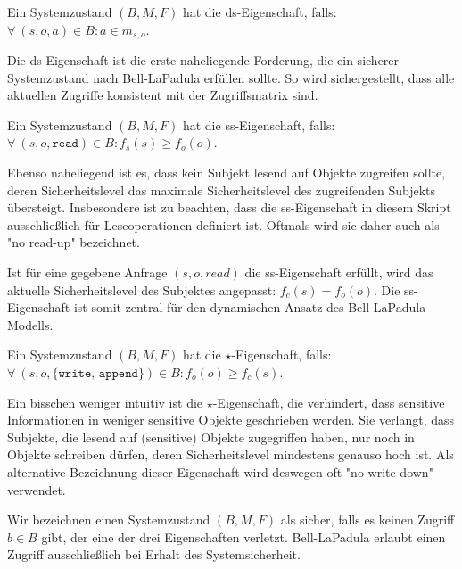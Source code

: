 \bigskip
\begin{definition}
	Ein Systemzustand \((B, M, F)\) hat die ds-Eigenschaft, falls: \(\forall\ (s, o, a) \in B : a \in m_{s,o}\).
\end{definition}
\bigskip

Die ds-Eigenschaft ist die erste naheliegende Forderung, die ein sicherer Systemzustand nach Bell-LaPadula erfüllen sollte. So wird sichergestellt, dass alle aktuellen Zugriffe konsistent mit der Zugriffsmatrix sind. 

\bigskip
\begin{definition}
	Ein Systemzustand \((B, M, F)\) hat die ss-Eigenschaft, falls: \(\forall\ (s, o, \texttt{read}) \in B : f_s(s) \geq f_o(o)\).
\end{definition}
\bigskip

Ebenso naheliegend ist es, dass kein Subjekt lesend auf Objekte zugreifen sollte, deren Sicherheitslevel das maximale
Sicherheitslevel des zugreifenden Subjekts übersteigt. Insbesondere ist zu beachten, dass die ss-Eigenschaft in diesem
Skript ausschließlich für Leseoperationen definiert ist. Oftmals wird sie daher auch als "{}no read-up"{} bezeichnet.

Ist für eine gegebene Anfrage \((s, o, read)\) die ss-Eigenschaft erfüllt, wird das aktuelle Sicherheitslevel des Subjektes angepasst: \(f_c(s) = f_o(o)\).
Die ss-Eigenschaft ist somit zentral für den dynamischen Ansatz des Bell-LaPadula-Modells.

\bigskip
\begin{definition}
	Ein Systemzustand \((B, M, F)\) hat die \(\star\)-Eigenschaft, falls: \(\forall\ (s, o, \texttt{\{write, append\}}) \in B : f_o(o) \geq f_c(s)\).
\end{definition}
\bigskip

Ein bisschen weniger intuitiv ist die \(\star\)-Eigenschaft, die verhindert, dass sensitive Informationen in weniger sensitive Objekte geschrieben werden. Sie verlangt, dass Subjekte, die lesend auf (sensitive) Objekte zugegriffen haben, nur noch in Objekte schreiben dürfen, deren Sicherheitslevel mindestens genauso hoch ist. Als alternative Bezeichnung dieser Eigenschaft wird deswegen oft "{}no write-down"{} verwendet.

Wir bezeichnen einen Systemzustand \((B, M, F)\) als sicher, falls es keinen Zugriff \(b \in B\) gibt, der eine der drei Eigenschaften verletzt. Bell-LaPadula erlaubt einen Zugriff ausschließlich bei Erhalt des Systemsicherheit.

